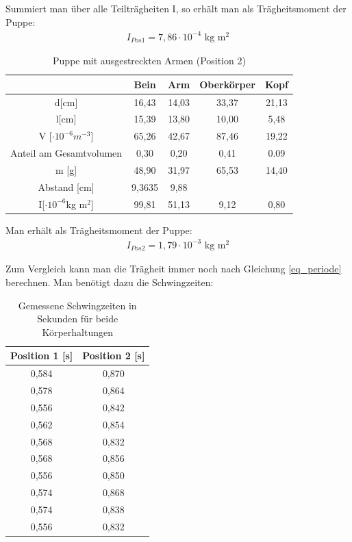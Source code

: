 Summiert man über alle Teilträgheiten I, so erhält man als Trägheitsmoment der Puppe:
\begin{align*}
I_{Pos 1}= 7,86
\cdot 10^{-4}\text{ kg m$^2$}
\end{align*}

\begin{table}[H]
\begin{tabular}{|c|c|c|c|c|}
\hline 		
&	Bein&	Arm	&Oberkörper	&Kopf	\\ \hline	
d[cm]&	16,43	&14,03&	33,37&	21,13		\\ \hline		
l[cm]&	15,39&	13,80&	10,00	&5,48\\ \hline
V [$\cdot 10^{-6}m^{-3}$]& 65,26&	42,67	&87,46&	19,22\\ \hline		
Anteil am Gesamtvolumen&	0,30	&0,20&	0,41&	0.09\\ \hline
m [g]&	48,90&	31,97	&65,53&	14,40\\ \hline
Abstand [cm] & 9,3635	&9,88	&&\\ \hline	
I[$\cdot 10^{-6}$kg m$^2$]&99,81	&51,13	&9,12&   0,80
\\ \hline
\end{tabular} 
\caption{Puppe mit ausgestreckten Armen (Position 2)}
\label{tab_pos2}
\end{table}

Man erhält als Trägheitsmoment der Puppe:
\begin{align*}
I_{Pos 2}=1,79\cdot 10^{-3}\text{ kg m$^2$}
\end{align*}

Zum Vergleich kann man die Trägheit immer noch nach Gleichung \eqref{eq_periode} berechnen. Man benötigt dazu die Schwingzeiten:
\begin{table}[H]
\begin{tabular}{|c|c|}
\hline 
Position 1 [s] & Position 2 [s]\\ \hline 
0,584&	0,870\\ \hline 
0,578&	0,864\\ \hline 
0,556&	0,842\\ \hline 
0,562&	0,854\\ \hline 
0,568&	0,832\\ \hline 
0,568&	0,856\\ \hline 
0,556&	0,850\\ \hline 
0,574&	0,868\\ \hline 
0,574&	0,838\\ \hline 
0,556&	0,832\\ \hline 
\end{tabular} 
\caption{Gemessene Schwingzeiten in Sekunden für beide Körperhaltungen}
\end{table}

